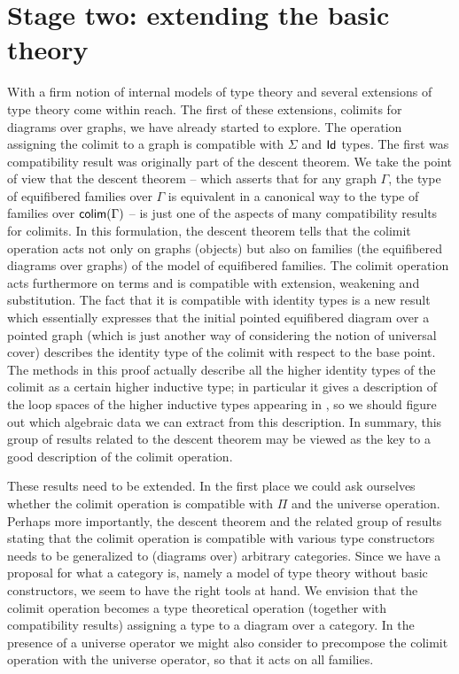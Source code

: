 \section{Stage two: extending the basic theory}\label{stage2}
With a firm notion of internal models of type theory and several extensions of
type theory come within reach. The first of these extensions, colimits for
diagrams over graphs, we have already started to explore. The operation 
assigning the colimit to a graph is compatible with $\Sigma$ and $\mathsf{Id}_{}$
types. The first was compatibility result was originally part of the descent
theorem. We take the point of view that the descent theorem -- which asserts that
for any graph $\Gamma$, the type of equifibered families over $\Gamma$ is
equivalent in a canonical way to the type of families over $\mathsf{colim}(\Gamma)$ --
is just one of the aspects of many compatibility results for colimits. In this
formulation, the descent theorem tells that the colimit operation acts not only
on graphs (objects) but also on families (the equifibered diagrams over graphs)
of the model of equifibered families.
The colimit operation acts furthermore on terms and is compatible with extension,
weakening and substitution. The fact that it is compatible with identity types is a new result
which essentially expresses that the initial pointed equifibered diagram over
a pointed graph (which is just another way of considering the notion of universal
cover) describes
the identity type of the colimit with respect to the base point. The methods
in this proof actually describe all the higher identity types of the colimit
as a certain higher inductive type; in particular it gives a description of the
loop spaces of the higher inductive types appearing in \cite{TheBook}, so we
should figure out which algebraic data we can extract from this description.
In summary, this group of results related to the descent theorem may be viewed as the
key to a good description of the colimit operation.

These results need to be extended. In the
first place we could ask ourselves whether the colimit operation is compatible
with $\Pi$ and the universe operation. Perhaps more importantly, the descent
theorem and the related group of results stating that the colimit operation
is compatible with various type constructors needs to be generalized to (diagrams
over) arbitrary categories. Since we have a proposal for what a category is,
namely a model of type theory without basic constructors, we seem to have the
right tools at hand.  We envision that the colimit operation becomes a type theoretical operation
(together with compatibility results) assigning a type to a diagram over a category.
In the presence of a universe operator we might also consider to precompose
the colimit operation with the universe operator, so that it acts on all families.

